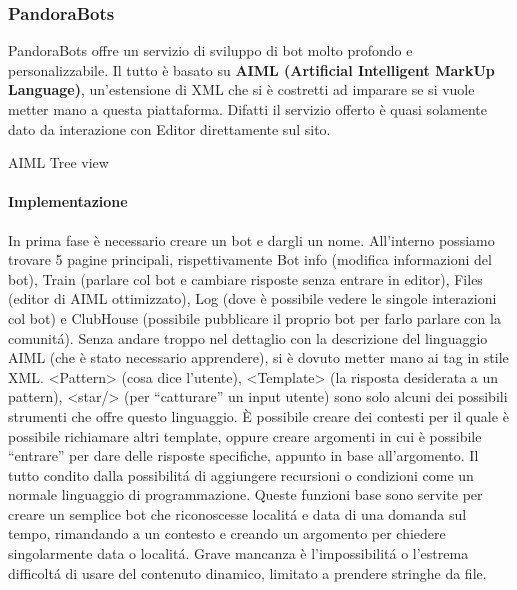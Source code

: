 \documentclass[]{article}
\begin{document}
\subsubsection{PandoraBots}
PandoraBots offre un servizio di sviluppo di bot molto profondo e personalizzabile. Il tutto è basato su \textbf{AIML (Artificial Intelligent MarkUp Language)}, un’estensione di XML che si è costretti ad imparare se si vuole metter mano a questa piattaforma. Difatti il servizio offerto è quasi solamente dato da interazione con Editor direttamente sul sito. 
\begin{center}
\footnotesize{AIML Tree view }
\end{center}
\paragraph{Implementazione}
In prima fase è necessario creare un bot e dargli un nome. All’interno possiamo trovare 5 pagine principali, rispettivamente Bot info (modifica informazioni del bot), Train (parlare col bot e cambiare risposte senza entrare in editor), Files (editor di AIML ottimizzato), Log (dove è possibile vedere le singole interazioni col bot) e ClubHouse (possibile pubblicare il proprio bot per farlo parlare con la comunitá). 
Senza andare troppo nel dettaglio con la descrizione del linguaggio AIML (che è stato necessario apprendere), si è dovuto metter mano ai tag in stile XML. <Pattern> (cosa dice l’utente), <Template> (la risposta desiderata a un pattern), <star/> (per “catturare” un input utente) sono solo alcuni dei possibili strumenti che offre questo linguaggio. È possibile creare dei contesti per il quale è possibile richiamare altri template, oppure creare argomenti in cui è possibile “entrare” per dare delle risposte specifiche, appunto in base all’argomento. Il tutto condito dalla possibilitá di aggiungere recursioni o condizioni come un normale linguaggio di programmazione. Queste funzioni base sono servite per creare un semplice bot che riconoscesse localitá e data di una domanda sul tempo, rimandando a un contesto e creando un argomento per chiedere singolarmente data o localitá. Grave mancanza è l’impossibilitá o l’estrema difficoltá di usare del contenuto dinamico, limitato a prendere stringhe da file. 
\end{document}
